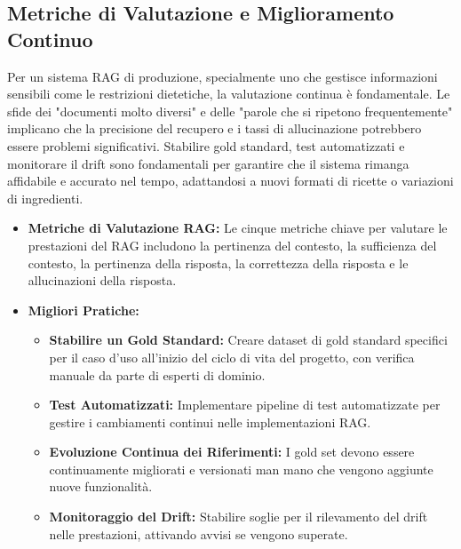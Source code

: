 \documentclass[a4paper, 11pt]{article}
\begin{document}
\subsection{Metriche di Valutazione e Miglioramento Continuo}
Per un sistema RAG di produzione, specialmente uno che gestisce informazioni sensibili come le restrizioni dietetiche, la valutazione continua è fondamentale. Le sfide dei "documenti molto diversi" e delle "parole che si ripetono frequentemente" implicano che la precisione del recupero e i tassi di allucinazione \cite{avoiding_hallucinations} potrebbero essere problemi significativi. Stabilire gold standard, test automatizzati e monitorare il drift \cite{rag_evaluation_metrics} sono fondamentali per garantire che il sistema rimanga affidabile e accurato nel tempo, adattandosi a nuovi formati di ricette o variazioni di ingredienti.
\begin{itemize}
    \item \textbf{Metriche di Valutazione RAG:} Le cinque metriche chiave per valutare le prestazioni del RAG includono la pertinenza del contesto, la sufficienza del contesto, la pertinenza della risposta, la correttezza della risposta e le allucinazioni della risposta. \cite{rag_evaluation_metrics}
    \item \textbf{Migliori Pratiche:}
    \begin{itemize}
        \item \textbf{Stabilire un Gold Standard:} Creare dataset di gold standard specifici per il caso d'uso all'inizio del ciclo di vita del progetto, con verifica manuale da parte di esperti di dominio. \cite{rag_evaluation_metrics}
        \item \textbf{Test Automatizzati:} Implementare pipeline di test automatizzate per gestire i cambiamenti continui nelle implementazioni RAG. \cite{rag_evaluation_metrics}
        \item \textbf{Evoluzione Continua dei Riferimenti:} I gold set devono essere continuamente migliorati e versionati man mano che vengono aggiunte nuove funzionalità. \cite{rag_evaluation_metrics}
        \item \textbf{Monitoraggio del Drift:} Stabilire soglie per il rilevamento del drift nelle prestazioni, attivando avvisi se vengono superate. \cite{rag_evaluation_metrics}
    \end{itemize}
\end{itemize}
\end{document}
